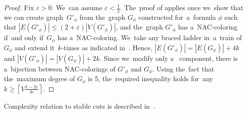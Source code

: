 \begin{proof}
	Fix $\varepsilon>0$. We~can assume $\varepsilon<\frac{1}{2}$.
	The~proof of  applies once we~show that
	we can create graph~$G'_\phi$ from the~graph $G_\phi$ constructed for~a~formula $\phi$
	such that $|E(G'_\phi)| \leq (2 + \varepsilon) |V(G'_\phi)|$, and
	the~graph $G'_\phi$ has a~NAC-coloring if~and only if~$G_\phi$ has a~NAC-coloring.
	We~take any braced ladder in~a~train of $G_\phi$
	and extend it~$k$-times as indicated in~.
	Hence, $|E(G'_\phi)| = |E(G_\phi)|+4k$ and $|V(G'_\phi)| = |V(G_\phi)|+2k$.
	Since we~modify only a~\trcon{} component,
	there is a~bijection between NAC-colorings of $G'_\phi$ and $G_\phi$.
	Using the~fact that the~maximum degree of $G_\phi$ is 5,
	the~required inequality holds for~any  $k\geq\left\lceil V\frac{1-2\varepsilon}{4\varepsilon}\right\rceil$.
\end{proof}

Complexity relation to stable cuts is described in~.

